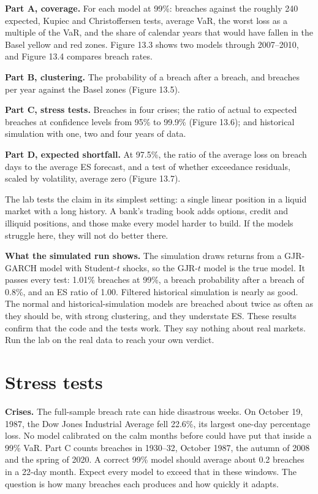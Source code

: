 \textbf{Part A, coverage.} For each model at 99\%: breaches against the roughly 240 expected, Kupiec and Christoffersen tests, average VaR, the worst loss as a multiple of the VaR, and the share of calendar years that would have fallen in the Basel yellow and red zones. Figure 13.3 shows two models through 2007--2010, and Figure 13.4 compares breach rates.

\textbf{Part B, clustering.} The probability of a breach after a breach, and breaches per year against the Basel zones (Figure 13.5).

\textbf{Part C, stress tests.} Breaches in four crises; the ratio of actual to expected breaches at confidence levels from 95\% to 99.9\% (Figure 13.6); and historical simulation with one, two and four years of data.

\textbf{Part D, expected shortfall.} At 97.5\%, the ratio of the average loss on breach days to the average ES forecast, and a test of whether exceedance residuals, scaled by volatility, average zero (Figure 13.7).

The lab tests the claim in its simplest setting: a single linear position in a liquid market with a long history. A bank's trading book adds options, credit and illiquid positions, and those make every model harder to build. If the models struggle here, they will not do better there.

\textbf{What the simulated run shows.} The simulation draws returns from a GJR-GARCH model with Student-$t$ shocks, so the GJR-$t$ model is the true model. It passes every test: 1.01\% breaches at 99\%, a breach probability after a breach of 0.8\%, and an ES ratio of 1.00. Filtered historical simulation is nearly as good. The normal and historical-simulation models are breached about twice as often as they should be, with strong clustering, and they understate ES. These results confirm that the code and the tests work. They say nothing about real markets. Run the lab on the real data to reach your own verdict.

\section{Stress tests}
\label{sec:13-stress}

\textbf{Crises.} The full-sample breach rate can hide disastrous weeks. On October 19, 1987, the Dow Jones Industrial Average fell 22.6\%, its largest one-day percentage loss. No model calibrated on the calm months before could have put that inside a 99\% VaR. Part C counts breaches in 1930--32, October 1987, the autumn of 2008 and the spring of 2020. A correct 99\% model should average about 0.2 breaches in a 22-day month. Expect every model to exceed that in these windows. The question is how many breaches each produces and how quickly it adapts.

